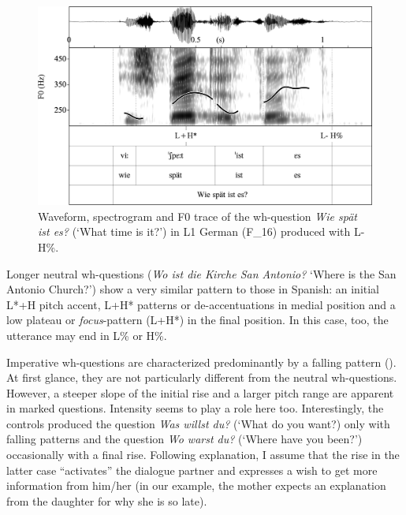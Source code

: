 \begin{figure}


\includegraphics[width=\textwidth]{figures/Figure_4.104.png}


\caption{Waveform, spectrogram and F0 trace of the wh-question \textit{Wie spät ist es?} (‘What time is it?’) in L1 German (F\_16) produced with L- H\%.}
\label{fig:4.104}
\end{figure}

Longer neutral wh-questions (\textit{Wo ist die Kirche San Antonio?} ‘Where is the San Antonio Church?’) show a very similar pattern to those in Spanish: an initial L*+H pitch accent, L+H* patterns or de-accentuations in medial position and a low plateau or \textit{focus}{}-pattern (L+H*) in the final position. In this case, too, the utterance may end in L\% or H\%.


Imperative wh-questions are characterized predominantly by a falling pattern (). At first glance, they are not particularly different from the neutral wh-questions. However, a steeper slope of the initial rise and a larger pitch range are apparent in marked questions. Intensity seems to play a role here too. Interestingly, the controls produced the question \textit{Was willst du?} (‘What do you want?) only with falling patterns and the question \textit{Wo warst du?} (‘Where have you been?’) occasionally with a final rise. Following  explanation, I assume that the rise in the latter case “activates” the dialogue partner and expresses a wish to get more information from him/her (in our example, the mother expects an explanation from the daughter for why she is so late).


